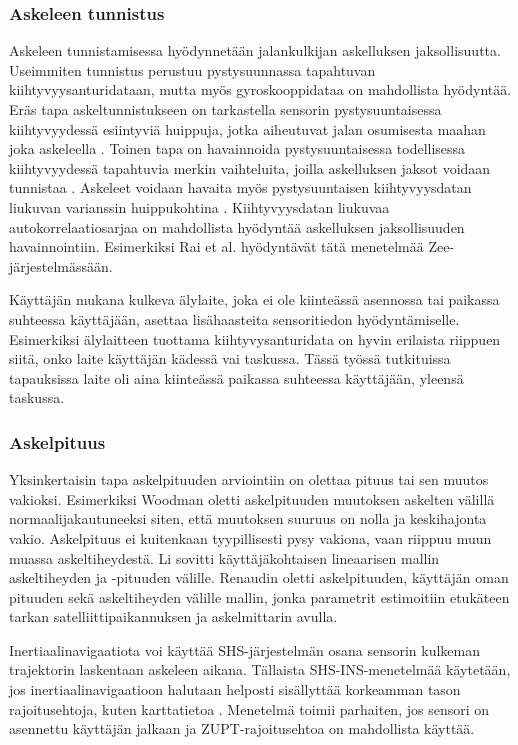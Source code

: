 \subsubsection{Askeleen tunnistus}

Askeleen tunnistamisessa hyödynnetään jalankulkijan askelluksen jaksollisuutta.
Useimmiten tunnistus perustuu pystysuunnassa tapahtuvan kiihtyvyysanturidataan,
mutta myös gyroskooppidataa on mahdollista hyödyntää.
Eräs tapa askeltunnistukseen
on tarkastella sensorin pystysuuntaisessa kiihtyvyydessä esiintyviä huippuja,
jotka aiheutuvat jalan osumisesta maahan joka askeleella \cite{wang2012}.
Toinen tapa on havainnoida pystysuuntaisessa todellisessa kiihtyvyydessä
tapahtuvia merkin vaihteluita, joilla askelluksen jaksot voidaan tunnistaa
\cite{fadjukoff2013}. Askeleet voidaan havaita myös pystysuuntaisen
kiihtyvyysdatan liukuvan varianssin huippukohtina \cite{steinhoff2010}.
Kiihtyvyysdatan liukuvaa autokorrelaatiosarjaa on mahdollista hyödyntää
askelluksen jaksollisuuden havainnointiin. Esimerkiksi Rai et al.
\cite{rai2012} hyödyntävät tätä menetelmää Zee-järjestelmässään.

Käyttäjän mukana kulkeva älylaite, joka ei ole kiinteässä asennossa
tai paikassa suhteessa käyttäjään, asettaa lisähaasteita sensoritiedon
hyödyntämiselle. Esimerkiksi älylaitteen tuottama kiihtyvysanturidata
on hyvin erilaista riippuen siitä, onko laite käyttäjän kädessä vai
taskussa. Tässä työssä tutkituissa tapauksissa laite oli aina kiinteässä
paikassa suhteessa käyttäjään, yleensä taskussa.

\subsubsection{Askelpituus}

Yksinkertaisin tapa askelpituuden arviointiin on olettaa pituus tai
sen muutos vakioksi. Esimerkiksi Woodman \cite{woodman2008} oletti
askelpituuden muutoksen askelten välillä normaalijakautuneeksi siten,
että muutoksen suuruus on nolla ja keskihajonta vakio. Askelpituus
ei kuitenkaan tyypillisesti pysy vakiona, vaan riippuu muun muassa
askeltiheydestä. Li \cite{li2012} sovitti käyttäjäkohtaisen lineaarisen
mallin askeltiheyden ja -pituuden välille. Renaudin
\cite{renaudin2013} oletti askelpituuden, käyttäjän oman pituuden sekä
askeltiheyden välille mallin, jonka parametrit estimoitiin etukäteen
tarkan satelliittipaikannuksen ja askelmittarin avulla.

Inertiaalinavigaatiota voi käyttää SHS-järjestelmän osana sensorin
kulkeman trajektorin
laskentaan askeleen aikana. Tällaista SHS-INS-menetelmää käytetään,
jos inertiaalinavigaatioon halutaan helposti sisällyttää korkeamman
tason rajoitusehtoja, kuten karttatietoa \cite{woodman2008}. Menetelmä
toimii parhaiten, jos sensori on asennettu käyttäjän jalkaan ja
ZUPT-rajoitusehtoa on mahdollista käyttää.

